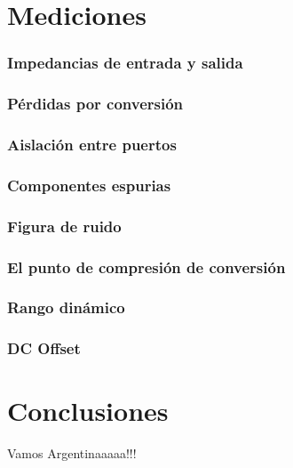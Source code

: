 \documentclass[a4paper,10pt]{article}
\begin{document}
	\section{Mediciones}
	\subsubsection{Impedancias de entrada y salida}
	\subsubsection{P\'erdidas por conversi\'on}
	\subsubsection{Aislación entre puertos}
	\subsubsection{Componentes espurias}
	\subsubsection{Figura de ruido}
	\subsubsection{El punto de compresi\'on de conversi\'on}
	\subsubsection{Rango din\'amico}
	\subsubsection{DC Offset}
	\newpage
	\section{Conclusiones}
	\indent Vamos Argentinaaaaa!!!
\end{document}
